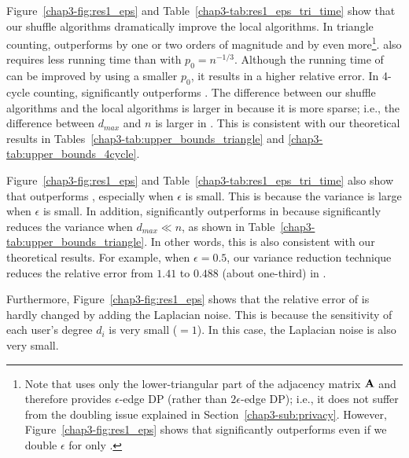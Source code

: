 Figure~\ref{chap3-fig:res1_eps} and Table~\ref{chap3-tab:res1_eps_tri_time} show that our shuffle algorithms dramatically improve the local algorithms. 
In triangle counting, 
\AlgWSTriVR{} outperforms \AlgWLTri{} by one or two orders of magnitude and \AlgARRTri{} by even more\footnote{Note that \AlgARRTri{} uses only the lower-triangular part of the adjacency matrix $\mathbf{A}$ and therefore provides 
$\epsilon$-edge DP (rather than $2\epsilon$-edge DP); i.e., it does not suffer from the doubling issue explained in Section~\ref{chap3-sub:privacy}. However, Figure~\ref{chap3-fig:res1_eps} shows that \AlgWSTriVR{} significantly outperforms \AlgARRTri{} 
even if we double $\epsilon$ for only \AlgWSTriVR{}.}. 
\AlgWSTriVR{} also requires less running time than \AlgARRTri{} with $p_0 = n^{-1/3}$. 
Although the running time of \AlgARRTri{} can be improved by using a smaller $p_0$, it results in a higher relative error. 
In 4-cycle counting, 
\AlgWSCyc{} significantly outperforms \AlgWLCyc{}. 
The difference between our shuffle algorithms and the local algorithms is larger in \IMDB{} because it is more sparse; i.e., the difference between $d_{max}$ and $n$ is larger in \IMDB{}. 
This is consistent with our theoretical results in Tables~\ref{chap3-tab:upper_bounds_triangle} and \ref{chap3-tab:upper_bounds_4cycle}. 

Figure~\ref{chap3-fig:res1_eps} and Table~\ref{chap3-tab:res1_eps_tri_time} also show that \AlgWSTriVR{} outperforms \AlgWSTri{}, especially when $\epsilon$ is small. 
This is because the variance is large when $\epsilon$ is small. 
In addition, \AlgWSTriVR{} significantly outperforms \AlgWSTri{} in \IMDB{} because \AlgWSTriVR{} significantly reduces the variance when $d_{max} \ll n$, as shown in Table~\ref{chap3-tab:upper_bounds_triangle}. 
In other words, this is also consistent with our theoretical results. 
For example, when $\epsilon=0.5$, our variance reduction technique reduces the relative error from $1.41$ to $0.488$ (about one-third) in \IMDB{}. 

Furthermore, Figure~\ref{chap3-fig:res1_eps} shows that the relative error of \AlgWSTriVR{} is hardly changed by adding the Laplacian noise. 
This is because the sensitivity of each user's degree $d_i$ is very small ($=1$). 
In this case, the Laplacian noise is also very small. 

